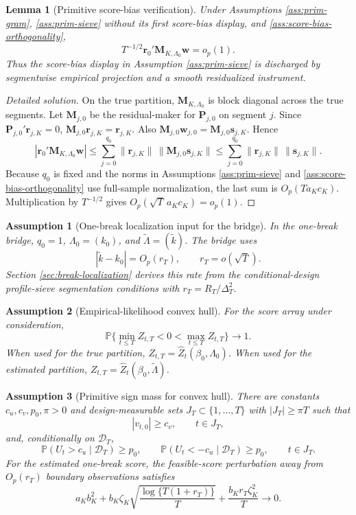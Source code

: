 \documentclass[12pt]{article}
\numberwithin{equation}{section}
\newtheorem{lemma}{Lemma}
\newtheorem{assumption}{Assumption}
\theoremstyle{definition}
\newcommand{\Pp}{\mathbb P}
\newcommand{\D}{\mathcal D}
\begin{document}
\begin{lemma}[Primitive score-bias verification]
\label{lem:primitive-score-bias}
Under Assumptions \ref{ass:prim-gram}, \ref{ass:prim-sieve} without its first
score-bias display, and \ref{ass:score-bias-orthogonality},
\[
    T^{-1/2}\bm r_0'\bm M_{K,\Lambda_0}\bm w=o_p(1).
\]
Thus the score-bias display in Assumption \ref{ass:prim-sieve} is discharged by
segmentwise empirical projection and a smooth residualized instrument.
\end{lemma}

\begin{proof}[Detailed solution]
On the true partition, \(\bm M_{K,\Lambda_0}\) is block diagonal across the
true segments.  Let \(\bm M_{j,0}\) be the residual-maker for \(\bm P_{j,0}\)
on segment \(j\).  Since \(\bm P_{j,0}'\bm r_{j,K}=0\),
\(\bm M_{j,0}\bm r_{j,K}=\bm r_{j,K}\).  Also
\(\bm M_{j,0}\bm w_{j,0}=\bm M_{j,0}\bm s_{j,K}\).  Hence
\[
    |\bm r_0'\bm M_{K,\Lambda_0}\bm w|
    \leq \sum_{j=0}^{q_0}
    \|\bm r_{j,K}\|\,\|\bm M_{j,0}\bm s_{j,K}\|
    \leq \sum_{j=0}^{q_0}\|\bm r_{j,K}\|\,\|\bm s_{j,K}\|.
\]
Because \(q_0\) is fixed and the norms in Assumptions \ref{ass:prim-sieve} and
\ref{ass:score-bias-orthogonality} use full-sample normalization, the last
sum is \(O_p(Ta_Kc_K)\).  Multiplication by \(T^{-1/2}\) gives
\(O_p(\sqrt T\,a_Kc_K)=o_p(1)\).
\end{proof}
\begin{assumption}[One-break localization input for the bridge]
\label{ass:prim-localization-target}
In the one-break bridge, \(q_0=1\), \(\Lambda_0=(k_0)\), and
\(\widetilde\Lambda=(\widetilde k)\).  The bridge uses
\[
    |\widetilde k-k_0|=O_p(r_T),
    \qquad
    r_T=o(\sqrt T).
\]
Section \ref{sec:break-localization} derives this rate from the
conditional-design profile-sieve segmentation conditions with
\(r_T=R_T/\Delta_T^2\).
\end{assumption}

\begin{assumption}[Empirical-likelihood convex hull]
\label{ass:prim-convex}
For the score array under consideration,
\[
    \Pp\{\min_{t\leq T}Z_{t,T}<0<\max_{t\leq T}Z_{t,T}\}\to1.
\]
When used for the true partition, \(Z_{t,T}=\widehat Z_t(\beta_0,\Lambda_0)\). When used for the estimated partition, \(Z_{t,T}=\widehat Z_t(\beta_0,\widetilde\Lambda)\).
\end{assumption}
\begin{assumption}[Primitive sign mass for convex hull]
\label{ass:prim-sign-mass}
There are constants \(c_u,c_v,p_0,\pi>0\) and design-measurable sets
\(J_T\subset\{1,\ldots,T\}\) with \(|J_T|\geq\pi T\) such that
\[
    |v_{t,0}|\geq c_v,
    \qquad t\in J_T,
\]
and, conditionally on \(\D_T\),
\[
    \Pp(U_t>c_u\mid\D_T)\geq p_0,
    \qquad
    \Pp(U_t<-c_u\mid\D_T)\geq p_0,
    \qquad t\in J_T.
\]
For the estimated one-break score, the feasible-score perturbation away from
\(O_p(r_T)\) boundary observations satisfies
\begin{equation}
    a_Kb_K^2
    +b_K\zeta_K\sqrt{\frac{\log\{T(1+r_T)\}}{T}}
    +\frac{b_Kr_T\zeta_K^2}{T}
    \longrightarrow0.
    \label{eq:convex-hull-transfer-rate}
\end{equation}
\end{assumption}
\end{document}
